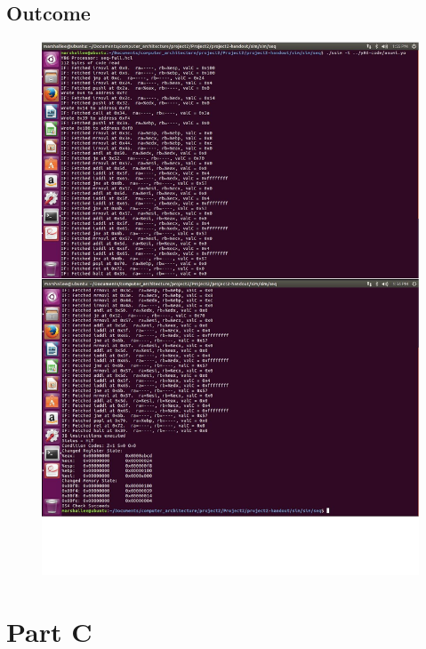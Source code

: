 \documentclass[12pt,a4paper]{article}
\theoremstyle{definition}
\numberwithin{equation}{section}
\numberwithin{figure}{section}
\begin{document}
\subsection{Outcome}
\begin{figure}[H]
	\centering
	\includegraphics[width=12cm]{iaddl.pdf}
\end{figure}
\newpage

\section{Part C}		
\end{document}
